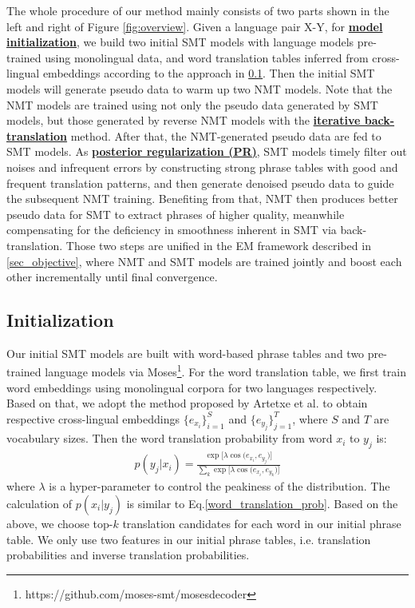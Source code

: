 \documentclass[letterpaper]{article} \usepackage{aaai19}  \usepackage{times}  \usepackage{helvet}  \usepackage{courier}  \usepackage{url}  \usepackage{graphicx}  \usepackage{amsmath}
\newcommand{\newref}[1]{Eq.\eqref{#1}}
\begin{document}
The whole procedure of our method mainly consists of two parts shown in the left and right of Figure \ref{fig:overview}.
Given a language pair X-Y, for \textbf{\underline{model initialization}}, we build two initial SMT models with language models pre-trained using monolingual data, and word translation tables inferred from cross-lingual embeddings according to the approach in \ref{sec_initialization}. 
Then the initial SMT models will generate pseudo data to warm up two NMT models. Note that the NMT models are trained using not only the pseudo data generated by SMT models, but those generated by reverse NMT models with the \textbf{\underline{iterative back-translation}} method. After that, the NMT-generated pseudo data are fed to SMT models. As \textbf{\underline{posterior regularization (PR)}}, SMT models timely filter out noises and infrequent errors by constructing strong phrase tables with good and frequent translation patterns, and then generate denoised pseudo data to guide the subsequent NMT training. Benefiting from that, NMT then produces better pseudo data for SMT to extract phrases of higher quality, meanwhile compensating for the deficiency in smoothness inherent in SMT via back-translation. Those two steps are unified in the EM framework described in \ref{sec_objective}, where NMT and SMT models are trained jointly and boost each other incrementally until final convergence.


\subsection{Initialization}
\label{sec_initialization}
Our initial SMT models are built with word-based phrase tables and two pre-trained language models via Moses\footnote{https://github.com/moses-smt/mosesdecoder}. For the word translation table, we first train word embeddings using monolingual corpora for two languages respectively. Based on that, we adopt the method proposed by Artetxe et al.  to obtain respective cross-lingual embeddings $\{e_{x_i}\}_{i=1}^S$ and $\{e_{y_j}\}_{j=1}^T$, where $S$ and $T$ are vocabulary sizes. Then the word translation probability from word $x_i$ to $y_j$ is:
\begin{equation}
\begin{aligned}
p(y_j|x_i)=\frac{\exp{[\lambda\cos({e_{x_i},e_{y_j}}})]}{\sum_k\exp{[\lambda\cos({e_{x_i},e_{y_k}}})]}
\end{aligned}\label{word_translation_prob}
\end{equation}
where $\lambda$ is a hyper-parameter to control the peakiness of the distribution. The calculation of $p(x_i|y_j)$ is similar to \newref{word_translation_prob}. Based on the above, we choose top-$k$ translation candidates for each word in our initial phrase table. We only use two features in our initial phrase tables, i.e. translation probabilities and inverse translation probabilities.
\end{document}
